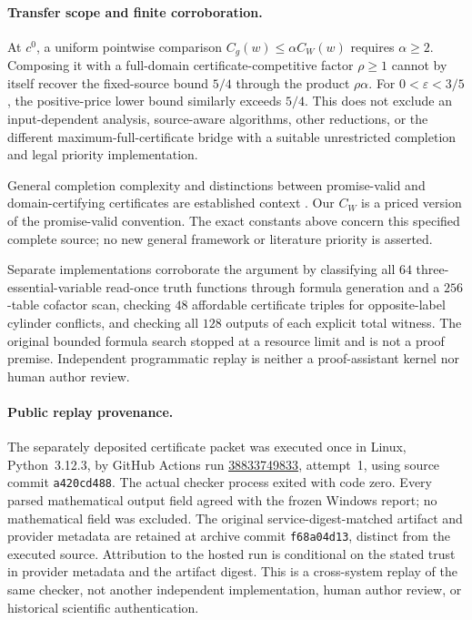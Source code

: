 \documentclass[pdflatex,sn-mathphys-num]{sn-jnl}
\theoremstyle{thmstyleone}
\theoremstyle{thmstylethree}
\theoremstyle{thmstyletwo}
\begin{document}
\paragraph*{Transfer scope and finite corroboration.}
At $c^0$, a uniform pointwise comparison
$C_g(w)\leq\alpha C_W(w)$ requires $\alpha\geq2$. Composing it
with a full-domain certificate-competitive factor $\rho\geq1$
cannot by itself recover the fixed-source bound $5/4$ through the
product $\rho\alpha$. For $0<\varepsilon<3/5$, the positive-price
lower bound similarly exceeds $5/4$. This does not exclude an
input-dependent analysis, source-aware algorithms, other reductions,
or the different maximum-full-certificate bridge with a suitable
unrestricted completion and legal priority implementation.

General completion complexity and distinctions between promise-valid
and domain-certifying certificates are established context
\cite{huffstutler2026completion}. Our $C_W$ is a priced version of
the promise-valid convention. The exact constants above concern this
specified complete source; no new general framework or literature
priority is asserted.

Separate implementations corroborate the argument by classifying
all $64$ three-essential-variable read-once truth functions through
formula generation and a $256$-table cofactor scan, checking $48$
affordable certificate triples for opposite-label cylinder conflicts,
and checking all $128$ outputs of each explicit total witness.
The original bounded formula search stopped at a resource limit and
is not a proof premise. Independent programmatic replay is neither
a proof-assistant kernel nor human author review.


\paragraph*{Public replay provenance.}
The separately deposited certificate packet was executed once in Linux,
Python~3.12.3, by GitHub Actions run
\href{https://github.com/SHiJiE1115/newproj/actions/runs/38833749833}{38833749833},
attempt~1, using source commit \texttt{a420cd488}. The actual checker
process exited with code zero. Every parsed mathematical output field
agreed with the frozen Windows report; no mathematical field was excluded.
The original service-digest-matched artifact and provider metadata are
retained at archive commit \texttt{f68a04d13}, distinct from the executed
source. Attribution to the hosted run is conditional on the stated trust
in provider metadata and the artifact digest. This is a cross-system replay
of the same checker, not another independent implementation, human author
review, or historical scientific authentication.
\end{document}
